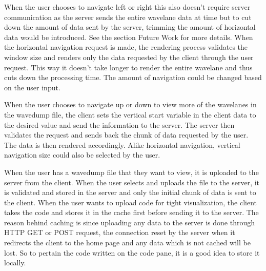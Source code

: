 \documentclass[14pt]{extarticle}
\begin{document}
\par When the user chooses to navigate left or right this also doesn't require server communication as the server sends the entire wavelane data at time but to cut down the amount of data sent by the server, trimming the amount of horizontal data would be introduced. See the section Future Work for more details. When the horizontal navigation request is made, the rendering process validates the window size and renders only the data requested by the client through the user request. This way it doesn't take longer to render the entire wavelane and thus cuts down the processing time. The amount of navigation could be changed based on the user input.

\par When the user chooses to navigate up or down to view more of the wavelanes in the wavedump file, the client sets the vertical start variable in the client data to the desired value and send the information to the server. The server then validates the request and sends back the chunk of data requested by the user. The data is then rendered accordingly. Alike horizontal navigation, vertical navigation size could also be selected by the user.

\par When the user has a wavedump file that they want to view, it is uploaded to the server from the client. When the user selects and uploads the file to the server, it is validated and stored in the server and only the initial chunk of data is sent to the client. When the user wants to upload code for tight visualization, the client takes the code and stores it in the cache first before sending it to the server. The reason behind caching is since uploading any data to the server is done through HTTP GET or POST request, the connection reset by the server when it redirects the client to the home page and any data which is not cached will be lost. So to pertain the code written on the code pane, it is a good idea to store it locally.

\newpage
\end{document}
